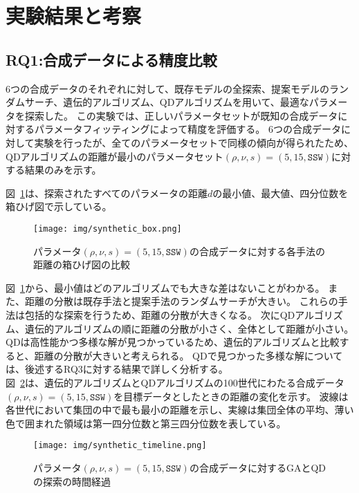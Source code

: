 \documentclass[uplatex,11pt,openany]{ujreport}
\begin{document}
    \section{実験結果と考察}
        \subsection{RQ1:合成データによる精度比較}
            6つの合成データのそれぞれに対して、既存モデルの全探索、提案モデルのランダムサーチ、遺伝的アルゴリズム、QDアルゴリズムを用いて、最適なパラメータを探索した。
            この実験では、正しいパラメータセットが既知の合成データに対するパラメータフィッティングによって精度を評価する。
            6つの合成データに対して実験を行ったが、全てのパラメータセットで同様の傾向が得られたため、QDアルゴリズムの距離が最小のパラメータセット$(\rho, \nu, s) = (5, 15, \texttt{SSW})$に対する結果のみを示す。

            図~\ref{fig:synthetic_boxplot}は、探索されたすべてのパラメータの距離$d$の最小値、最大値、四分位数を箱ひげ図で示している。
            \begin{figure}[H]
                \centering
                \texttt{[image: img/synthetic\_box.png]}
                \caption{パラメータ$(\rho,\nu,s)=(5,15,\texttt{SSW})$の合成データに対する各手法の距離の箱ひげ図の比較}
                \label{fig:synthetic_boxplot}
            \end{figure}


            図~\ref{fig:synthetic_boxplot}から、最小値はどのアルゴリズムでも大きな差はないことがわかる。
            また、距離の分散は既存手法と提案手法のランダムサーチが大きい。
            これらの手法は包括的な探索を行うため、距離の分散が大きくなる。
            次にQDアルゴリズム、遺伝的アルゴリズムの順に距離の分散が小さく、全体として距離が小さい。
            QDは高性能かつ多様な解が見つかっているため、遺伝的アルゴリズムと比較すると、距離の分散が大きいと考えられる。
            QDで見つかった多様な解については、後述するRQ3に対する結果で詳しく分析する。\\

            図~\ref{fig:synthetic_timeline}は、遺伝的アルゴリズムとQDアルゴリズムの100世代にわたる合成データ$(\rho, \nu, s) = (5, 15, \texttt{SSW})$を目標データとしたときの距離の変化を示す。
            波線は各世代において集団の中で最も最小の距離を示し、実線は集団全体の平均、薄い色で囲まれた領域は第一四分位数と第三四分位数を表している。

            \begin{figure}[H]
                \centering
                \texttt{[image: img/synthetic\_timeline.png]}
                \caption{パラメータ$(\rho,\nu,s)=(5,15,\texttt{SSW})$の合成データに対するGAとQDの探索の時間経過}
                \label{fig:synthetic_timeline}
            \end{figure}
\end{document}
